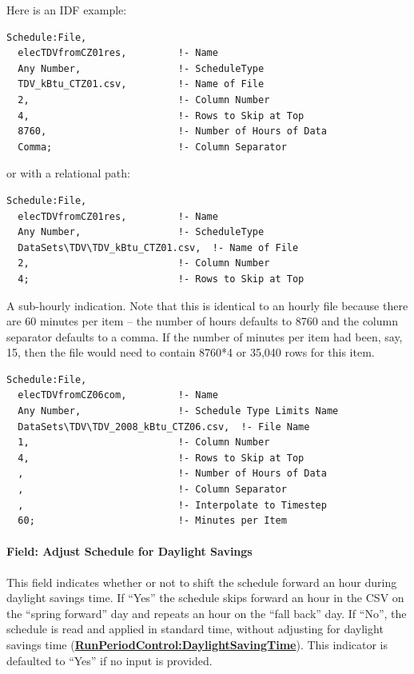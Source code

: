 Here is an IDF example:

\begin{lstlisting}
Schedule:File,
  elecTDVfromCZ01res,         !- Name
  Any Number,                 !- ScheduleType
  TDV_kBtu_CTZ01.csv,         !- Name of File
  2,                          !- Column Number
  4,                          !- Rows to Skip at Top
  8760,                       !- Number of Hours of Data
  Comma;                      !- Column Separator
\end{lstlisting}

or with a relational path:

\begin{lstlisting}
Schedule:File,
  elecTDVfromCZ01res,         !- Name
  Any Number,                 !- ScheduleType
  DataSets\TDV\TDV_kBtu_CTZ01.csv,  !- Name of File
  2,                          !- Column Number
  4;                          !- Rows to Skip at Top
\end{lstlisting}

A sub-hourly indication. Note that this is identical to an hourly file because there are 60 minutes per item -- the number of hours defaults to 8760 and the column separator defaults to a comma. If the number of minutes per item had been, say, 15, then the file would need to contain 8760*4 or 35,040 rows for this item.

\begin{lstlisting}
Schedule:File,
  elecTDVfromCZ06com,         !- Name
  Any Number,                 !- Schedule Type Limits Name
  DataSets\TDV\TDV_2008_kBtu_CTZ06.csv,  !- File Name
  1,                          !- Column Number
  4,                          !- Rows to Skip at Top
  ,                           !- Number of Hours of Data
  ,                           !- Column Separator
  ,                           !- Interpolate to Timestep
  60;                         !- Minutes per Item
\end{lstlisting}

\paragraph{Field: Adjust Schedule for Daylight Savings}\label{adjust-schedule-for-daylight-savings-1}

This field indicates whether or not to shift the schedule forward an hour during daylight savings time. If ``Yes'' the schedule skips forward an hour in the CSV on the ``spring forward'' day and repeats an hour on the ``fall back'' day. If  ``No'', the schedule is read and applied in standard time, without adjusting for daylight savings time (\textbf{\hyperref[runperiodcontroldaylightsavingtime]{RunPeriodControl:DaylightSavingTime}}). This indicator is defaulted to ``Yes'' if no input is provided.

